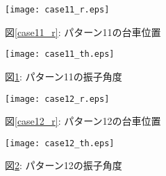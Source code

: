 \begin{figure}[htbp]
    \begin{minipage}{0.5\hsize}
        \begin{center}
            \texttt{[image: case11\_r.eps]}
            \caption{図\ref{case11_r}: パターン11の台車位置}
            \label{case11_r}
        \end{center}
    \end{minipage}
    \begin{minipage}{0.5\hsize}
        \begin{center}
            \texttt{[image: case11\_th.eps]}
            \caption{図\ref{case11_th}: パターン11の振子角度}
            \label{case11_th}
        \end{center}
    \end{minipage}
\end{figure}

\begin{figure}[htbp]
    \begin{minipage}{0.5\hsize}
        \begin{center}
            \texttt{[image: case12\_r.eps]}
            \caption{図\ref{case12_r}: パターン12の台車位置}
            \label{case12_r}
        \end{center}
    \end{minipage}
    \begin{minipage}{0.5\hsize}
        \begin{center}
            \texttt{[image: case12\_th.eps]}
            \caption{図\ref{case12_th}: パターン12の振子角度}
            \label{case12_th}
        \end{center}
    \end{minipage}
\end{figure}

